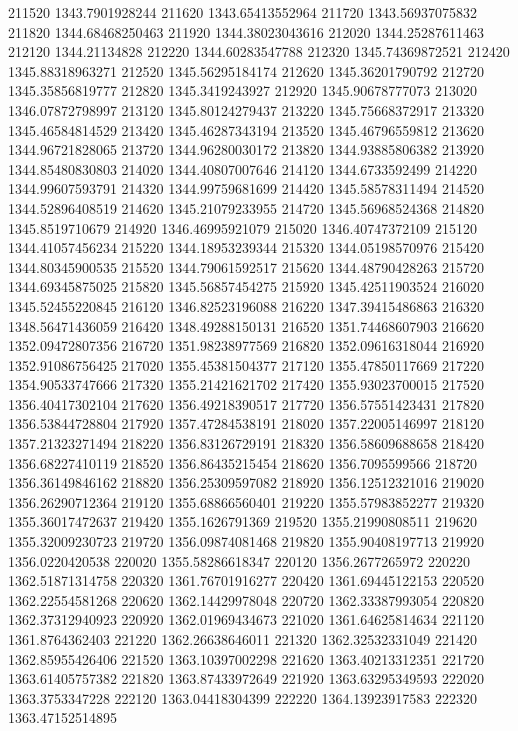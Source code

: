 {211520 1343.7901928244
211620 1343.65413552964
211720 1343.56937075832
211820 1344.68468250463
211920 1344.38023043616
212020 1344.25287611463
212120 1344.21134828
212220 1344.60283547788
212320 1345.74369872521
212420 1345.88318963271
212520 1345.56295184174
212620 1345.36201790792
212720 1345.35856819777
212820 1345.3419243927
212920 1345.90678777073
213020 1346.07872798997
213120 1345.80124279437
213220 1345.75668372917
213320 1345.46584814529
213420 1345.46287343194
213520 1345.46796559812
213620 1344.96721828065
213720 1344.96280030172
213820 1344.93885806382
213920 1344.85480830803
214020 1344.40807007646
214120 1344.6733592499
214220 1344.99607593791
214320 1344.99759681699
214420 1345.58578311494
214520 1344.52896408519
214620 1345.21079233955
214720 1345.56968524368
214820 1345.8519710679
214920 1346.46995921079
215020 1346.40747372109
215120 1344.41057456234
215220 1344.18953239344
215320 1344.05198570976
215420 1344.80345900535
215520 1344.79061592517
215620 1344.48790428263
215720 1344.69345875025
215820 1345.56857454275
215920 1345.42511903524
216020 1345.52455220845
216120 1346.82523196088
216220 1347.39415486863
216320 1348.56471436059
216420 1348.49288150131
216520 1351.74468607903
216620 1352.09472807356
216720 1351.98238977569
216820 1352.09616318044
216920 1352.91086756425
217020 1355.45381504377
217120 1355.47850117669
217220 1354.90533747666
217320 1355.21421621702
217420 1355.93023700015
217520 1356.40417302104
217620 1356.49218390517
217720 1356.57551423431
217820 1356.53844728804
217920 1357.47284538191
218020 1357.22005146997
218120 1357.21323271494
218220 1356.83126729191
218320 1356.58609688658
218420 1356.68227410119
218520 1356.86435215454
218620 1356.7095599566
218720 1356.36149846162
218820 1356.25309597082
218920 1356.12512321016
219020 1356.26290712364
219120 1355.68866560401
219220 1355.57983852277
219320 1355.36017472637
219420 1355.1626791369
219520 1355.21990808511
219620 1355.32009230723
219720 1356.09874081468
219820 1355.90408197713
219920 1356.0220420538
220020 1355.58286618347
220120 1356.2677265972
220220 1362.51871314758
220320 1361.76701916277
220420 1361.69445122153
220520 1362.22554581268
220620 1362.14429978048
220720 1362.33387993054
220820 1362.37312940923
220920 1362.01969434673
221020 1361.64625814634
221120 1361.8764362403
221220 1362.26638646011
221320 1362.32532331049
221420 1362.85955426406
221520 1363.10397002298
221620 1363.40213312351
221720 1363.61405757382
221820 1363.87433972649
221920 1363.63295349593
222020 1363.3753347228
222120 1363.04418304399
222220 1364.13923917583
222320 1363.47152514895
}
